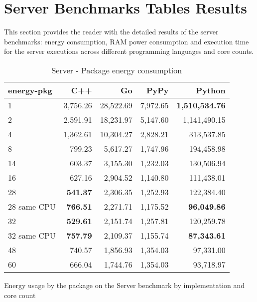 
\chapter{Server Benchmarks Tables Results}

This section provides the reader with the detailed results of the server benchmarks: energy consumption, RAM power consumption and execution time for the server executions across different programming languages and core counts.

\begin{table}[H]
    \centering
    \begin{tabular}{lrrrr}
        \hline
        energy-pkg     & C++                & Go         & PyPy       & Python        \\
        \hline
        1              & 3,756.26            & 28,522.69   & 7,972.65   & \textbf{1,510,534.76}  \\
        2              & 2,591.91            & 18,231.97   & 5,147.60   & 1,141,490.15           \\
        4              & 1,362.61            & 10,304.27   & 2,828.21   &   313,537.85           \\
        8	           &   799.23 	         & 5,617.27    & 1,747.96   &	194,458.98           \\ 
        14             &   603.37            & 3,155.30    & 1,232.03   &   130,506.94           \\
        16             &   627.16            & 2,904.52    & 1,140.80   &   111,438.01           \\
        28             &   \textbf{541.37}   & 2,306.35    & 1,252.93   &   122,384.40           \\
        28 same CPU    &   \textbf{766.51}   & 2,271.71    & 1,175.52   &   \textbf{96,049.86}   \\
        32             &   \textbf{529.61}   & 2,151.74    & 1,257.81   &   120,259.78           \\
        32 same CPU    &   \textbf{757.79}   & 2,109.37    & 1,155.74   &   \textbf{87,343.61}   \\
        48             &   740.57            & 1,856.93    & 1,354.03   &    97,331.00           \\
        60             &   666.04            & 1,744.76    & 1,354.03   &    93,718.97           \\
        \hline
    \end{tabular}
\caption{Server - Package energy consumption}{Energy usage by the package on the Server benchmark by implementation and core count}
\label{tab:server-energy-pkg}
\end{table}

